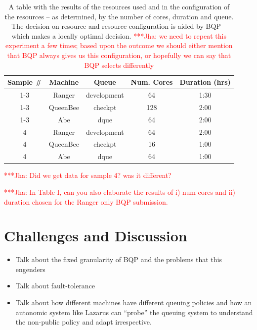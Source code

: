 \documentclass[conference,final]{IEEEtran}
\newcommand{\jhanote}[1]{ {\textcolor{red} { ***Jha: #1 }}}
\newcommand{\jhanote}[1]{}
\begin{document}
\begin{table}
\begin{tabular}{|c|c|c|c|c|}
\hline Sample \# & Machine & Queue & Num. Cores & Duration (hrs) \\ 
\hline 1-3 & Ranger & development & 64 & 1:30 \\ 
\hline 1-3 & QueenBee & checkpt & 128 & 2:00 \\ 
\hline 1-3 & Abe & dque & 64 & 2:00 \\ 
\hline 4 & Ranger & development & 64 & 2:00 \\ 
\hline 4 & QueenBee & checkpt & 16 & 1:00 \\ 
\hline 4 & Abe & dque & 64 & 1:00 \\ 
\hline 
\end{tabular} 
\caption{A table with the results of the resources used and in
  the configuration of the resources -- as determined, by the
  number of cores, duration and queue. The decision on
  resource and resource configuration is aided by BQP -- which 
  makes a locally optimal decision. \jhanote{we need to repeat
    this experiment a few times; based upon the outcome we should either
    mention that BQP always gives us this configuration, or hopefully we
    can say that BQP selects differently}}
\end{table}

\jhanote{Did we get data for sample 4? was it different?}

\jhanote{In Table I, can you also elaborate the results of i) num cores and
ii) duration chosen for the Ranger only BQP submission.}



\section{Challenges and Discussion}

\begin{itemize}
\item Talk about the fixed granularity of BQP and the problems that this
engenders
\item Talk about fault-tolerance
\item Talk about how different machines have different queuing policies
  and how an autonomic system like Lazarus can ``probe'' the queuing
  system to understand the non-public policy and adapt irrespective.
\end{itemize}

\end{document}
